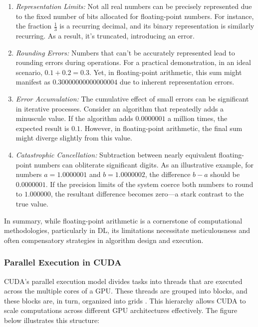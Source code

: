 \begin{enumerate}
    \item \textit{Representation Limits:} Not all real numbers can be precisely represented due to the fixed number of bits allocated for floating-point numbers. For instance, the fraction \( \frac{1}{3} \) is a recurring decimal, and its binary representation is similarly recurring. As a result, it's truncated, introducing an error.\\
    
    \item \textit{Rounding Errors:} Numbers that can't be accurately represented lead to rounding errors during operations. For a practical demonstration, in an ideal scenario, \( 0.1 + 0.2 = 0.3 \). Yet, in floating-point arithmetic, this sum might manifest as \( 0.30000000000000004 \) due to inherent representation errors.\\
    
    \item \textit{Error Accumulation:} The cumulative effect of small errors can be significant in iterative processes. Consider an algorithm that repeatedly adds a minuscule value. If the algorithm adds \( 0.0000001 \) a million times, the expected result is \( 0.1 \). However, in floating-point arithmetic, the final sum might diverge slightly from this value.\\
    
    \item \textit{Catastrophic Cancellation:} Subtraction between nearly equivalent floating-point numbers can obliterate significant digits. As an illustrative example, for numbers \( a = 1.0000001 \) and \( b = 1.0000002 \), the difference \( b - a \) should be \( 0.0000001 \). If the precision limits of the system coerce both numbers to round to \( 1.000000 \), the resultant difference becomes zero—a stark contrast to the true value.
\end{enumerate}

In summary, while floating-point arithmetic is a cornerstone of computational methodologies, particularly in DL, its limitations necessitate meticulousness and often compensatory strategies in algorithm design and execution.
\subsubsection*{Parallel Execution in CUDA}

CUDA's parallel execution model divides tasks into threads that are executed across the multiple cores of a GPU. These threads are grouped into blocks, and these blocks are, in turn, organized into grids \cite{chetlur2014cudnn}. This hierarchy allows CUDA to scale computations across different GPU architectures effectively. The figure below illustrates this structure:\\


